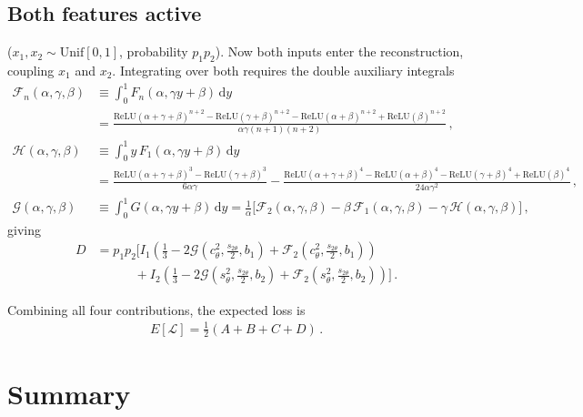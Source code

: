 \documentclass[a4paper]{article}
\begin{document}
\subsection{Both features active} ($x_1,x_2\sim\mathrm{Unif}[0,1]$, probability $p_1 p_2$). Now both inputs enter the reconstruction, coupling $x_1$ and $x_2$. Integrating over both requires the double auxiliary integrals
\begin{align}
\mathcal{F}_n(\alpha,\gamma,\beta) &\equiv \int_0^1 F_n(\alpha,\gamma y+\beta)\,\mathrm{d}y \nonumber\\
&= \frac{\mathrm{ReLU}(\alpha+\gamma+\beta)^{n+2}-\mathrm{ReLU}(\gamma+\beta)^{n+2}-\mathrm{ReLU}(\alpha+\beta)^{n+2}+\mathrm{ReLU}(\beta)^{n+2}}{\alpha\gamma(n+1)(n+2)}\,, \\[8pt]
\mathcal{H}(\alpha,\gamma,\beta) &\equiv \int_0^1 y\,F_1(\alpha,\gamma y+\beta)\,\mathrm{d}y \nonumber\\
&= \frac{\mathrm{ReLU}(\alpha+\gamma+\beta)^3-\mathrm{ReLU}(\gamma+\beta)^3}{6\alpha\gamma}
- \frac{\mathrm{ReLU}(\alpha+\gamma+\beta)^4-\mathrm{ReLU}(\alpha+\beta)^4-\mathrm{ReLU}(\gamma+\beta)^4+\mathrm{ReLU}(\beta)^4}{24\alpha\gamma^2}\,, \\[8pt]
\mathcal{G}(\alpha,\gamma,\beta) &\equiv \int_0^1 G(\alpha,\gamma y+\beta)\,\mathrm{d}y
= \frac{1}{\alpha}\Big[\mathcal{F}_2(\alpha,\gamma,\beta) - \beta\,\mathcal{F}_1(\alpha,\gamma,\beta) - \gamma\,\mathcal{H}(\alpha,\gamma,\beta)\Big]\,,
\end{align}
giving
\begin{align}
D &= p_1 p_2\bigg[I_1\!\left(\tfrac{1}{3}-2\mathcal{G}\!\left(c^2_\theta,\tfrac{s_{2\theta}}{2},b_1\right)+\mathcal{F}_2\!\left(c^2_\theta,\tfrac{s_{2\theta}}{2},b_1\right)\right) \nonumber\\
&\qquad\quad + I_2\!\left(\tfrac{1}{3}-2\mathcal{G}\!\left(s^2_\theta,\tfrac{s_{2\theta}}{2},b_2\right)+\mathcal{F}_2\!\left(s^2_\theta,\tfrac{s_{2\theta}}{2},b_2\right)\right)\bigg]\,.
\end{align}

Combining all four contributions, the expected loss is
\begin{align}
\boxed{E[\mathcal{L}] = \frac{1}{2}(A+B+C+D)\,.}
\end{align}

\section*{Summary}
\end{document}
